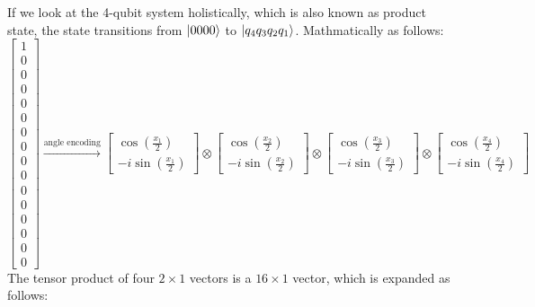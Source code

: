 \documentclass[12pt]{article}
\numberwithin{equation}{section}  %
\theoremstyle{definition}
\theoremstyle{plain}
\theoremstyle{remark}
\begin{document}
If we look at the 4-qubit system holistically, which is also known as product state, the state transitions from $\ket{0000}$ to $\ket{q_4q_3q_2q_1}$. Mathmatically as follows:
\[\begin{bmatrix}
    1\\0\\0\\0\\0\\0\\0\\0\\0\\0\\0\\0\\0\\0\\0\\0
\end{bmatrix}\xrightarrow{\text{angle encoding}}
\begin{bmatrix}\cos(\frac{x_1}{2})\\-i\sin(\frac{x_1}{2})\end{bmatrix}\otimes
\begin{bmatrix}\cos(\frac{x_2}{2})\\-i\sin(\frac{x_2}{2})\end{bmatrix}\otimes
\begin{bmatrix}\cos(\frac{x_3}{2})\\-i\sin(\frac{x_3}{2})\end{bmatrix}\otimes
\begin{bmatrix}\cos(\frac{x_4}{2})\\-i\sin(\frac{x_4}{2})\end{bmatrix}\]
The tensor product of four $2\times 1$ vectors is a $16\times 1$ vector, which is expanded as follows:
\end{document}
